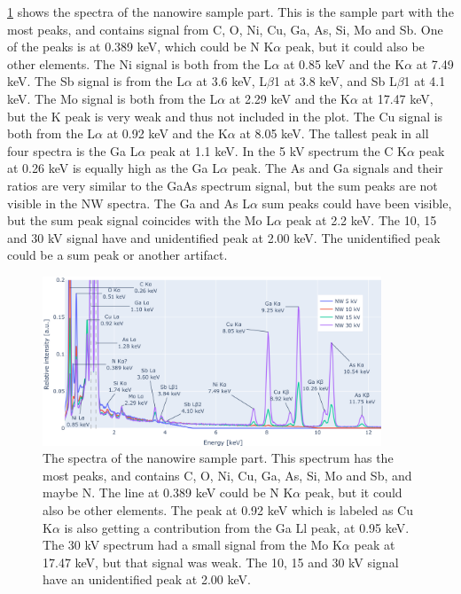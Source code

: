 \cref{fig:results:Spectra_NW} shows the spectra of the nanowire sample part.
This is the sample part with the most peaks, and contains signal from C, O, Ni, Cu, Ga, As, Si, Mo and Sb.
One of the peaks is at 0.389 keV, which could be N K$\alpha$ peak, but it could also be other elements. %
The Ni signal is both from the L$\alpha$ at 0.85 keV and the K$\alpha$ at 7.49 keV.
The Sb signal is from the L$\alpha$ at 3.6 keV, L$\beta$1 at 3.8 keV, and Sb L$\beta$1 at 4.1 keV. %
The Mo signal is both from the L$\alpha$ at 2.29 keV and the K$\alpha$ at 17.47 keV, but the K peak is very weak and thus not included in the plot.
The Cu signal is both from the L$\alpha$ at 0.92 keV and the K$\alpha$ at 8.05 keV.
The tallest peak in all four spectra is the Ga L$\alpha$ peak at 1.1 keV.
In the 5 kV spectrum the C K$\alpha$ peak at 0.26 keV is equally high as the Ga L$\alpha$ peak.
The As and Ga signals and their ratios are very similar to the GaAs spectrum signal, but the sum peaks are not visible in the NW spectra.
The Ga and As L$\alpha$ sum peaks could have been visible, but the sum peak signal coincides with the Mo L$\alpha$ peak at 2.2 keV. %
The 10, 15 and 30 kV signal have and unidentified peak at 2.00 keV.
The unidentified peak could be a sum peak or another artifact.

\begin{figure}[h]
    \centering
    \includegraphics[width=0.90\textwidth]{figures/each_spectra/NW_everything.png}
    \caption{
        The spectra of the nanowire sample part.
        This spectrum has the most peaks, and contains  C, O, Ni, Cu, Ga, As, Si, Mo and Sb, and maybe N.
        The line at 0.389 keV could be N K$\alpha$ peak, but it could also be other elements. %
        The peak at 0.92 keV which is labeled as Cu K$\alpha$ is also getting a contribution from the Ga Ll peak, at 0.95 keV. %
        The 30 kV spectrum had a small signal from the Mo K$\alpha$ peak at 17.47 keV, but that signal was weak.
        The 10, 15 and 30 kV signal have an unidentified peak at 2.00 keV. %
    }
    \label{fig:results:Spectra_NW}
\end{figure}

